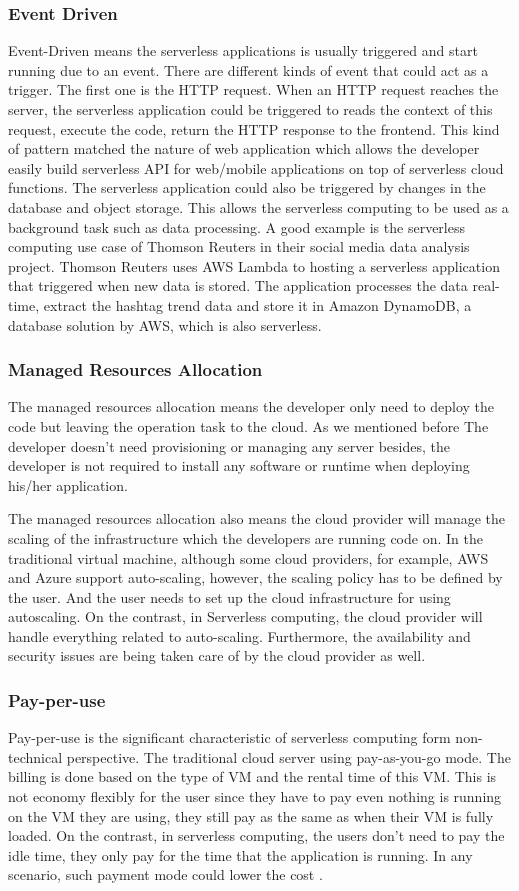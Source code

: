 \subsubsection{Event Driven}
Event-Driven means the serverless applications is usually triggered and start running due to an event. There are different kinds of event that could act as a trigger. The first one is the HTTP request. When an HTTP request reaches the server, the serverless application could be triggered to reads the context of this request, execute the code, return the HTTP response to the frontend. This kind of pattern matched the nature of web application which allows the developer easily build serverless API for web/mobile applications on top of serverless cloud functions. The serverless application could also be triggered by changes in the database and object storage. This allows the serverless computing to be used as a background task such as data processing. A good example is the serverless computing use case of Thomson Reuters in their social media data analysis project\cite{ThomsonR38:online}. Thomson Reuters uses AWS Lambda to hosting a serverless application that triggered when new data is stored. The application processes the data real-time, extract the hashtag trend data and store it in Amazon DynamoDB, a database solution by AWS, which is also serverless.
\subsubsection{Managed Resources Allocation}
The managed resources allocation means the developer only need to deploy the code but leaving the operation task to the cloud. As we mentioned before The developer doesn't need provisioning or managing any server besides, the developer is not required to install any software or runtime \cite{Serverle64:online} when deploying his/her application. 
\par
The managed resources allocation also means the cloud provider will manage the scaling of the infrastructure which the developers are running code on. In the traditional virtual machine, although some cloud providers, for example, AWS and Azure support auto-scaling, however, the scaling policy has to be defined by the user. And the user needs to set up the cloud infrastructure for using autoscaling. On the contrast, in Serverless computing, the cloud provider will handle everything related to auto-scaling.
Furthermore, the availability and security issues are being taken care of by the cloud provider as well. 
\subsubsection{Pay-per-use}
Pay-per-use is the significant characteristic of serverless computing form non-technical perspective. The traditional cloud server using pay-as-you-go mode. The billing is done based on the type of VM and the rental time of this VM. This is not economy flexibly for the user since they have to pay even nothing is running on the VM they are using, they still pay as the same as when their VM is fully loaded. On the contrast, in serverless computing, the users don't need to pay the idle time, they only pay for the time that the application is running. In any scenario, such payment mode could lower the cost \cite{jonas2019cloud}.
